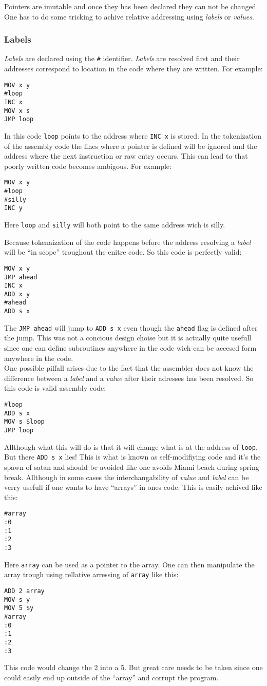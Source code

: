 \documentclass{article}
\newcommand{\V}{\verb}
\begin{document}
Pointers are imutable and once they has been declared they can not be changed.
One has to do some tricking to achive relative addressing using \emph{labels} or
\emph{values}.


\subsubsection{Labels}
\emph{Labels} are declared using the \V+#+ identifier.
\emph{Labels} are resolved first and their addresses
correspond to location in the code where they are written. For example:
\begin{verbatim}
MOV x y
#loop
INC x
MOV x s
JMP loop
\end{verbatim}
In this code \V+loop+ points to the address where \V+INC x+ is stored. In the
tokenization of the assembly code the lines where a pointer is defined will be
ignored and the address where the next instruction or raw entry occurs. This can
lead to that poorly written code becomes ambigous. For example:
\begin{verbatim}
MOV x y
#loop
#silly
INC y
\end{verbatim}
Here \V+loop+ and \V+silly+ will both point to the same address wich is silly.

Because tokenaization of the code happens before the address resolving a \emph{label}
will be ``in scope'' troughout the enitre code. So this code is perfectly valid:

\begin{verbatim}
MOV x y
JMP ahead
INC x
ADD x y
#ahead
ADD s x
\end{verbatim}
The \V+JMP ahead+ will jump to \V+ADD s x+ even though the \V+ahead+ flag is
defined after the jump. This was not a concious design choise but it is actually
quite usefull since one can define subroutines anywhere in the code wich can be
accesed form anywhere in the code.\\
One possible piffall arises due to the fact that the assembler does not know the
difference between a \emph{label} and a \emph{value} after their adresses has been resolved.
So this code is valid assembly code:
\begin{verbatim}
#loop
ADD s x
MOV s $loop
JMP loop
\end{verbatim}
Allthough what this will do is that it will change what is at the address of
\V+loop+. But there \V+ADD s x+ lies! This is what is known as self-modifiying
code and it's the spawn of satan and should be avoided like one avoids Miami
beach during spring break. Allthough in some cases the interchangability of
\emph{value} and \emph{label} can be verry usefull if one wants to have ``arrays'' in ones
code. This is easily achived like this:
\begin{verbatim}
#array
:0
:1
:2
:3
\end{verbatim}
Here \V+array+ can be used as a pointer to the array. One can then manipulate
the array trough using rellative arressing of \V+array+ like this:
\begin{verbatim}
ADD 2 array
MOV s y
MOV 5 $y
#array
:0
:1
:2
:3
\end{verbatim}
This code would change the 2 into a 5. But great care needs to be taken since
one could easily end up outside of the ``array'' and corrupt the program.
\end{document}
